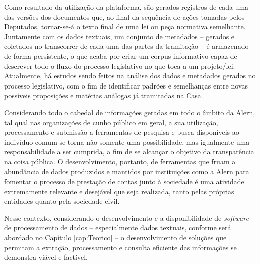 Como resultado da utilização da plataforma, são gerados registros de cada uma das versões dos documentos que, ao final da sequência de ações tomadas pelos Deputados, tornar-se-á o texto final de uma lei ou peça normativa semelhante. Juntamente com os dados textuais, um conjunto de metadados -- gerados e coletados no transcorrer de cada uma das partes da tramitação -- é armazenado de forma persistente, o que acaba por criar um corpus informativo capaz de descrever todo o fluxo do processo legislativo no que toca a um projeto/lei. Atualmente, há estudos sendo feitos na análise dos dados e metadados gerados no processo legislativo, com o fim de identificar padrões e semelhanças entre novas possíveis proposições e matérias análogas já tramitadas na Casa.

Considerando todo o cabedal de informações geradas em todo o âmbito da \ac{Alern}, tal qual nas organizações de cunho público em geral, a sua utilização, processamento e submissão a ferramentas de pesquisa e busca disponíveis ao indivíduo comum se torna não somente uma possibilidade, mas igualmente uma responsabilidade a ser cumprida, a fim de se alcançar o objetivo da transparência na coisa pública. O desenvolvimento, portanto, de ferramentas que fruam a abundância de dados produzidos e mantidos por instituições como a \ac{Alern} para fomentar o processo de prestação de contas junto à sociedade é uma atividade extremamente relevante e desejável que seja realizada, tanto pelas próprias entidades quanto pela sociedade civil.

Nesse contexto, considerando o desenvolvimento e a disponibilidade de \textit{software} de processamento de dados -- especialmente dados textuais, conforme será abordado no Capítulo \ref{cap:Teorico} -- o desenvolvimento de soluções que permitam a extração, processamento e consulta eficiente das informações se demonstra viável e factível.